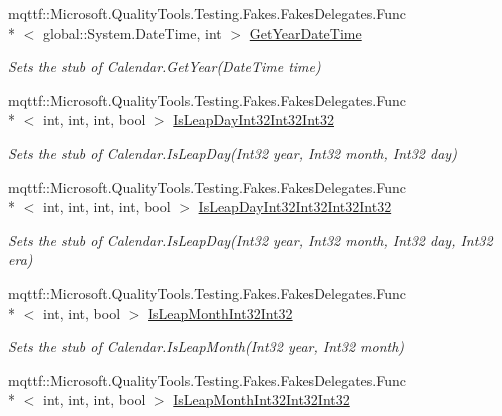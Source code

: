 \begin{DoxyCompactItemize}
mqttf\-::\-Microsoft.\-Quality\-Tools.\-Testing.\-Fakes.\-Fakes\-Delegates.\-Func\\*
$<$ global\-::\-System.\-Date\-Time, int $>$ \hyperlink{class_system_1_1_globalization_1_1_fakes_1_1_stub_calendar_a4c33bdb46775428085b9587569c194f1}{Get\-Year\-Date\-Time}
\begin{DoxyCompactList}\small\item\em Sets the stub of Calendar.\-Get\-Year(\-Date\-Time time)\end{DoxyCompactList}\item 
mqttf\-::\-Microsoft.\-Quality\-Tools.\-Testing.\-Fakes.\-Fakes\-Delegates.\-Func\\*
$<$ int, int, int, bool $>$ \hyperlink{class_system_1_1_globalization_1_1_fakes_1_1_stub_calendar_a880c1e00f96dfa34c89b68b113158629}{Is\-Leap\-Day\-Int32\-Int32\-Int32}
\begin{DoxyCompactList}\small\item\em Sets the stub of Calendar.\-Is\-Leap\-Day(\-Int32 year, Int32 month, Int32 day)\end{DoxyCompactList}\item 
mqttf\-::\-Microsoft.\-Quality\-Tools.\-Testing.\-Fakes.\-Fakes\-Delegates.\-Func\\*
$<$ int, int, int, int, bool $>$ \hyperlink{class_system_1_1_globalization_1_1_fakes_1_1_stub_calendar_a43eb2ac377507bdb5063b2b05efce6f7}{Is\-Leap\-Day\-Int32\-Int32\-Int32\-Int32}
\begin{DoxyCompactList}\small\item\em Sets the stub of Calendar.\-Is\-Leap\-Day(\-Int32 year, Int32 month, Int32 day, Int32 era)\end{DoxyCompactList}\item 
mqttf\-::\-Microsoft.\-Quality\-Tools.\-Testing.\-Fakes.\-Fakes\-Delegates.\-Func\\*
$<$ int, int, bool $>$ \hyperlink{class_system_1_1_globalization_1_1_fakes_1_1_stub_calendar_a1466e0d69e232c8450e4012f2db21128}{Is\-Leap\-Month\-Int32\-Int32}
\begin{DoxyCompactList}\small\item\em Sets the stub of Calendar.\-Is\-Leap\-Month(\-Int32 year, Int32 month)\end{DoxyCompactList}\item 
mqttf\-::\-Microsoft.\-Quality\-Tools.\-Testing.\-Fakes.\-Fakes\-Delegates.\-Func\\*
$<$ int, int, int, bool $>$ \hyperlink{class_system_1_1_globalization_1_1_fakes_1_1_stub_calendar_a322fe775a2f70fbae39fed73d2c7a0dc}{Is\-Leap\-Month\-Int32\-Int32\-Int32}

\end{DoxyCompactItemize}
